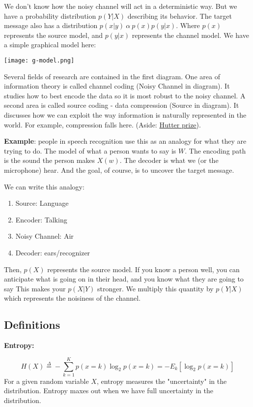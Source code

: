 \documentclass{article}
\begin{document}
\smallskip
We don't know how the noisy channel will act in a deterministic way. But we have a probability distribution $p(Y|X)$ describing its behavior. The target message also has a distribution $p(x|y) \ \alpha \ p(x) p(y|x)$. Where $p(x)$ represents the source model, and $p(y|x)$ represents the channel model. We have a simple graphical model here:

\begin{center}
\texttt{[image: g-model.png]}
\end{center}


\smallskip
Several fields of research are contained in the first diagram. One area of information theory is called channel coding (Noisy Channel in diagram). It studies how to best encode the data so it is most robust to the noisy channel. A second area is called source coding - data compression (Source in diagram). It discusses how we can exploit the way information is naturally represented in the world. For example, compression falls here. (Aside: \href{http://prize.hutter1.net/}{Hutter prize}).

\smallskip
\textbf{Example}: people in speech recognition use this as an analogy for what they are trying to do. The model of what a person wants to say is $W$. The encoding path is the sound the person makes $X(w)$. The decoder is what we (or the microphone) hear. And the goal, of course, is to uncover the target message.

\smallskip
We can write this analogy:
\begin{enumerate}
\item Source: Language
\item Encoder: Talking
\item Noisy Channel: Air
\item Decoder: ears/recognizer
\end{enumerate}

\smallskip
Then, $p(X)$ represents the source model. If you know a person well, you can anticipate what is going on in their head, and you know what they are going to say This makes your $p(X|Y)$ stronger. We multiply this quantity by $p(Y|X)$ which represents the noisiness of the channel.

\subsection{Definitions}

\textbf{Entropy:}

$$H(X) \overset{\Delta}{=}  - \sum_{k=1}^K p(x=k) \log_2 p(x = k) = -E_k[\log_2 p(x=k)]$$
For a given random variable $X$, entropy measures the "uncertainty" in the distribution. Entropy maxes out when we have full uncertainty in the distribution. 
\end{document}
